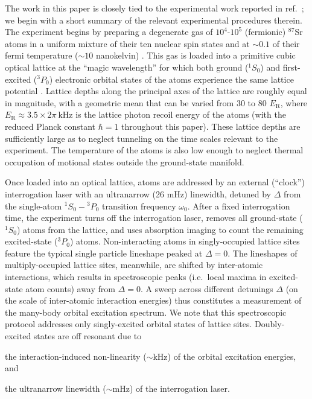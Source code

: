 \documentclass[preprint,showkeys,nofootinbib]{revtex4-1}
\renewcommand{\t}{\text} %
\newcommand{\1}{\mathds{1}}
\begin{document}
The work in this paper is closely tied to the experimental work
reported in ref.~\cite{goban2018emergence}; we begin with a short
summary of the relevant experimental procedures therein.  The
experiment begins by preparing a degenerate gas of $10^4$-$10^5$
(fermionic) ${}^{87}$Sr atoms in a uniform mixture of their ten
nuclear spin states and at $\sim0.1$ of their fermi temperature
($\sim10$ nanokelvin) \cite{campbell2017fermidegenerate,
  marti2018imaging}.  This gas is loaded into a primitive cubic
optical lattice at the ``magic wavelength'' for which both ground
(${}^1S_0$) and first-excited (${}^3P_0$) electronic orbital states of
the atoms experience the same lattice potential \cite{ye2008quantum}.
Lattice depths along the principal axes of the lattice are roughly
equal in magnitude, with a geometric mean that can be varied from 30
to 80 $E_{\t{R}}$, where $E_{\t{R}}\approx3.5\times2\pi~\t{kHz}$ is
the lattice photon recoil energy of the atoms (with the reduced Planck
constant $\hbar=1$ throughout this paper).  These lattice depths are
sufficiently large as to neglect tunneling on the time scales relevant
to the experiment.  The temperature of the atoms is also low enough to
neglect thermal occupation of motional states outside the ground-state
manifold.

Once loaded into an optical lattice, atoms are addressed by an
external (``clock'') interrogation laser with an ultranarrow (26 mHz)
linewidth, detuned by $\Delta$ from the single-atom ${}^1S_0-{}^3P_0$
transition frequency $\omega_0$.  After a fixed interrogation time,
the experiment turns off the interrogation laser, removes all
ground-state (${}^1S_0$) atoms from the lattice, and uses absorption
imaging to count the remaining excited-state (${}^3P_0$) atoms.
Non-interacting atoms in singly-occupied lattice sites feature the
typical single particle lineshape peaked at $\Delta=0$.  The
lineshapes of multiply-occupied lattice sites, meanwhile, are shifted
by inter-atomic interactions, which results in spectroscopic peaks
(i.e.~local maxima in excited-state atom counts) away from $\Delta=0$.
A sweep across different detunings $\Delta$ (on the scale of
inter-atomic interaction energies) thus constitutes a measurement of
the many-body orbital excitation spectrum.  We note that this
spectroscopic protocol addresses only singly-excited orbital states of
lattice sites.  Doubly-excited states are off resonant due to
\begin{enumerate*}
\item the interaction-induced non-linearity ($\sim$kHz) of the orbital
  excitation energies, and
\item the ultranarrow linewidth ($\sim$mHz) of the interrogation
  laser.
\end{enumerate*}
\end{document}
